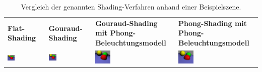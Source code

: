 \begin{table}[H]
    \centering
    \caption{Vergleich der genannten Shading-Verfahren anhand einer
    Beispielszene\protect\footnotemark.}\label{table:shading_comparision}
    \begin{tabular}{p{}p{}p{}p{}}
        \toprule
            \textbf{Flat-Shading} &
            \textbf{Gouraud-Shading} &
            \textbf{Gouraud-Shading mit Phong-Beleuchtungsmodell} &
            \textbf{Phong-Shading mit Phong-Beleuchtungsmodell} \\
            \cmidrule(r){1-1}\cmidrule(lr){2-2}\cmidrule(lr){3-3}\cmidrule(l){4-4}
            \includegraphics[width=0.2\textwidth]{img/flat_shading_example.png} \newline &
            \includegraphics[width=0.2\textwidth]{img/gouraud_shading_example.png} \newline &
            \includegraphics[width=0.2\textwidth]{img/phong_gouraud_shading_example.png} \newline &
            \includegraphics[width=0.2\textwidth]{img/phong_phong_shading_example.png} \newline \\
        \bottomrule
    \end{tabular}
\end{table}
